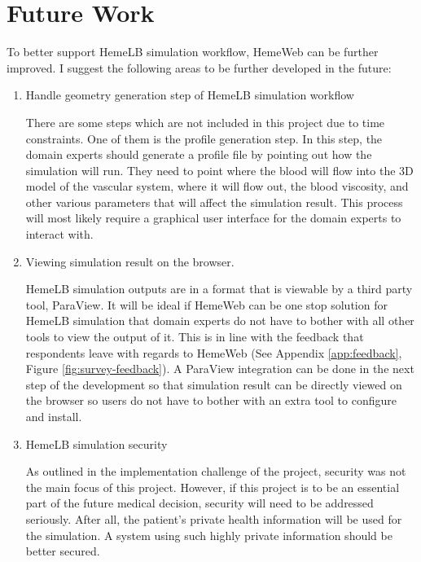  

\chapter[Future Work]{Future Work}

To better support HemeLB simulation workflow, HemeWeb can be further improved. I suggest the following areas to be further developed in the future:

\begin{enumerate}
    \item Handle geometry generation step of HemeLB simulation workflow
    
    There are some steps which are not included in this project due to time constraints. One of them is the profile generation step. In this step, the domain experts should generate a profile file by pointing out how the simulation will run. They need to point where the blood will flow into the 3D  model of the vascular system, where it will flow out, the blood viscosity, and other various parameters that will affect the simulation result. This process will most likely require a graphical user interface for the domain experts to interact with.
    
    \item Viewing simulation result on the browser.
    
    HemeLB simulation outputs are  in a format that is viewable by a third party tool, ParaView. It will be ideal if HemeWeb can be one stop solution for HemeLB simulation that domain experts do not have to bother with all other tools to view the output of it. This is in line with the feedback that respondents leave with regards to HemeWeb (See Appendix \ref{app:feedback}, Figure \ref{fig:survey-feedback}).  A ParaView integration can be done in the next step of the development so that simulation result can be directly viewed on the browser so users do not have to bother with an extra tool to configure and install.
    
    \item HemeLB simulation security
    
    As outlined in the implementation challenge of the project, security was not the main focus of this project. However, if this project is to be an essential part of the future medical decision, security will need to be addressed seriously. After all, the patient's private health information will be used for the simulation. A system using such highly private information should be better secured.


\end{enumerate}
